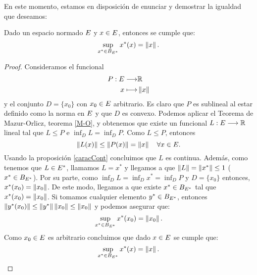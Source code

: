 En este momento, estamos en disposición de enunciar y demostrar la igualdad que deseamos:
\begin{proposicionBox}
	Dado un espacio normado $ E $ y $ x \in E $, entonces se cumple que:
	\begin{equation}\label{iguNorm}
	\sup_{x^* \in B_{E ^ *}} x^*(x) = \left\Vert x\right\Vert.
	\end{equation}
\end{proposicionBox}
\begin{proof}
Consideramos el funcional 
\begin{equation*}
\begin{split}
P:E \longrightarrow &\mathbb{R} \\
x \longmapsto &\left\Vert x\right\Vert
\end{split}
\end{equation*} 
y el conjunto $ D = \{x_0\} $ con $ x_0 \in E $ arbitrario. Es claro que $ P $ es sublineal al estar definido como la norma en $ E $ y que $ D $ es convexo. Podemos aplicar el Teorema de Mazur-Orlicz, teorema \ref{M-O}, y obtenemos que existe un funcional $ L:E \longrightarrow \mathbb{R} $ lineal tal que $ L \leq P $ e $ \inf_D L = \inf_D P $. Como $ L \leq P $, entonces 
\begin{equation*}
 	\left\Vert L(x)\right\Vert \leq \left\Vert P(x)\right\Vert = \left\Vert x\right\Vert \quad \forall x \in E.
\end{equation*}
Usando la proposición \ref{caracCont} concluimos que $ L $ es continua. Además, como tenemos que $ L \in E ^* $, llamamos $ L = x^* $ y llegamos a que $ \left\Vert L\right\Vert = \left\Vert x^*\right\Vert  \leq 1$ ($ x^* \in  B_{E ^ *} $).  Por su parte, como  $ \inf_D L = \inf_D x^* = \inf_D P $ y $ D = \{x_0\} $ entonces, $ x^*(x_0) = \left\Vert x_0\right\Vert $. De este modo, llegamos a que existe $ x^* \in B_{E^*} $ tal que $ x^*(x_0) = \left\Vert x_0\right\Vert $. Si tomamos cualquier elemento $ y^* \in B_{E^*}  $, entonces $ \left\Vert y^*(x_0)\right\Vert \leq \left\Vert y^*\right\Vert \left\Vert x_0\right\Vert \leq \left\Vert x_0\right\Vert $ y podemos asegurar que:
\[
\sup_{x^* \in B_{E ^ *}} x^*(x_0) = \left\Vert x_0\right\Vert.
\] 
Como $ x_0 \in E $ es arbitrario concluimos que dado $ x \in E $ se cumple que:
\begin{equation*}
\sup_{x^* \in B_{E ^ *}} x^*(x) = \left\Vert x\right\Vert.
\end{equation*}
\end{proof}